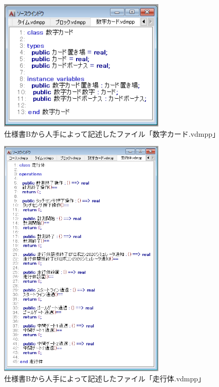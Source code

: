 \begin{figure}[tp]
    \begin{center}
    \includegraphics[width=300]{image/speB_vdm6.PNG}
    \caption{仕様書Bから人手によって記述したファイル「数字カード.vdmpp」}
    \label{fig:speB_vdm6}
    \end{center}
\end{figure}

\begin{figure}[tp]
    \begin{center}
    \includegraphics[width=300]{image/speB_vdm7.PNG}
    \caption{仕様書Bから人手によって記述したファイル「走行体.vdmpp」}
    \label{fig:speB_vdm7}
    \end{center}
\end{figure}


